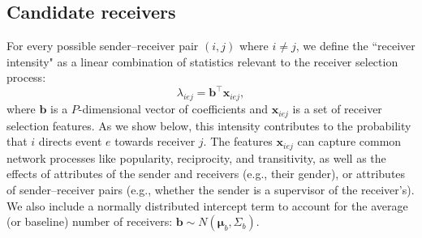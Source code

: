 \documentclass[ba]{imsart}
\numberwithin{equation}{section}
\theoremstyle{plain}
\begin{document}
	\subsection{Candidate receivers}\label{subsec: Tie}
	For every possible sender--receiver pair $(i,j)$ where $i \!\neq\! j$, we define the ``receiver intensity" as a linear combination of statistics relevant to the receiver selection process:
	\begin{equation}
		\lambda_{iej} = {\boldsymbol{b}}^{\top}\boldsymbol{x}_{iej},
	\end{equation}
	where $\boldsymbol{b}$ is a $P$-dimensional vector of coefficients and $\boldsymbol{x}_{iej}$ is a set of receiver selection features. As we show below, this intensity contributes to the probability that $i$ directs event $e$ towards receiver $j$. The features $\boldsymbol{x}_{iej}$ can capture common network processes like popularity, reciprocity, and transitivity, as well as the effects of attributes of the sender and receivers (e.g., their gender), or attributes of sender--receiver pairs (e.g., whether the sender is a supervisor of the receiver's). We also include a normally distributed intercept term to account for the average (or baseline) number of receivers: $\boldsymbol{b} \sim N(\boldsymbol{\mu}_b, \Sigma_b)$.~
	
\end{document}

